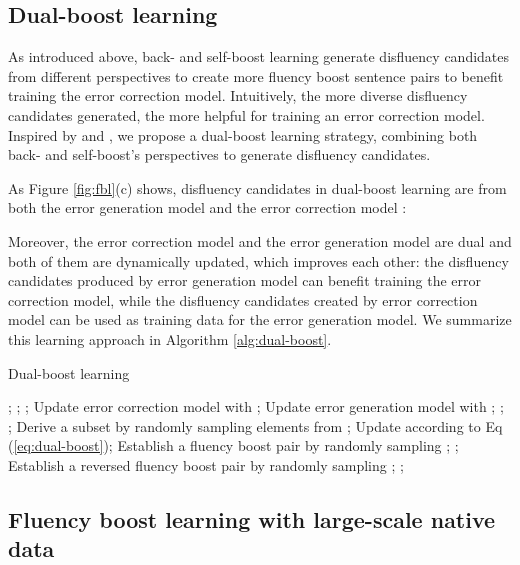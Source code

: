 \documentclass{article} \usepackage{MSRA_TR,times}
\begin{document}
\subsection{Dual-boost learning}\label{subsec:dualboost}

As introduced above, back- and self-boost learning generate disfluency candidates from different perspectives to create more fluency boost sentence pairs to benefit training the error correction model. Intuitively, the more diverse disfluency candidates generated, the more helpful for training an error correction model. Inspired by \cite{he2016dual} and \cite{zhang2018joint}, we propose a dual-boost learning strategy, combining both back- and self-boost's perspectives to generate disfluency candidates. 

As Figure \ref{fig:fbl}(c) shows, disfluency candidates in dual-boost learning are from both the error generation model and the error correction model :

\vspace{-0.4cm}
\vspace{-0.2cm}

Moreover, the error correction model and the error generation model are dual and both of them are dynamically updated, which improves each other: the disfluency candidates produced by error generation model can benefit training the error correction model, while the disfluency candidates created by error correction model can be used as training data for the error generation model. We summarize this learning approach in Algorithm \ref{alg:dual-boost}.

\begin{algorithm}[t]
\centering
\caption{Dual-boost learning\label{alg:dual-boost}}
\begin{algorithmic}[1]
\State ;
\EndFor
\State ; ; 
\State Update error correction model  with ;
\State Update error generation model  with ;
\State ; ; 
\State Derive a subset  by randomly sampling  elements from ; 
\State Update  according to Eq (\ref{eq:dual-boost});
\State Establish a fluency boost pair  by randomly sampling ;
\State ;
\State Establish a reversed fluency boost pair  by randomly sampling ;
\State ;
\EndFor
\EndFor
\end{algorithmic}
\end{algorithm}

\subsection{Fluency boost learning with large-scale native data}\label{subsec:native}
\end{document}
